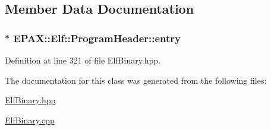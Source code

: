 \subsection{\-Member \-Data \-Documentation}
\hypertarget{class_e_p_a_x_1_1_elf_1_1_program_header_a25865997e5c358b60ff630a68494c89c}{
\subsubsection[{entry}]{$\ast$ {\bf \-E\-P\-A\-X\-::\-Elf\-::\-Program\-Header\-::entry}}}\label{class_e_p_a_x_1_1_elf_1_1_program_header_a25865997e5c358b60ff630a68494c89c}


\-Definition at line 321 of file \-Elf\-Binary.\-hpp.



\-The documentation for this class was generated from the following files\-:\begin{DoxyCompactItemize}
\item 
\hyperlink{_elf_binary_8hpp}{\-Elf\-Binary.\-hpp}\item 
\hyperlink{_elf_binary_8cpp}{\-Elf\-Binary.\-cpp}\end{DoxyCompactItemize}
